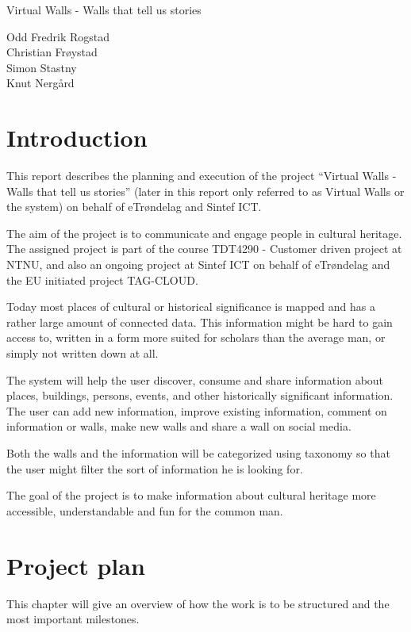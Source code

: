 \documentclass[11pt]{book}
\begin{document}
\frontmatter

\begingroup
\thispagestyle{empty}
\centering
\vspace*{9cm}
\par\normalfont\fontsize{35}{35}\sffamily\selectfont
Virtual Walls - Walls that tell us stories\par
\vspace*{1cm}
{\Huge Odd Fredrik Rogstad\\Christian Frøystad\\Simon Stastny\\Knut Nergård}\par
\endgroup

\tableofcontents

\mainmatter
\chapter{Introduction}
This report describes the planning and execution of the project ``Virtual Walls - Walls that tell us stories'' (later in this report only referred to as Virtual Walls or the system) on behalf of eTrøndelag and Sintef ICT.

The aim of the project is to communicate and engage people in cultural heritage. The assigned project is part of the course TDT4290 - Customer driven project at NTNU, and also an ongoing project at Sintef ICT on behalf of eTrøndelag and the EU initiated project TAG-CLOUD.

Today most places of cultural or historical significance is mapped and has a rather large amount of connected data. This information might be hard to gain access to, written in a form more suited for scholars than the average man, or simply not written down at all.

The system will help the user discover, consume and share information about places, buildings, persons, events, and other historically significant information. The user can add new information, improve existing information, comment on information or walls, make new walls and share a wall on social media.

Both the walls and the information will be categorized using taxonomy so that the user might filter the sort of information he is looking for.

The goal of the project is to make information about cultural heritage more accessible, understandable and fun for the common man.

\chapter{Project plan}
This chapter will give an overview of how the work is to be structured and the most important milestones.
\end{document}

